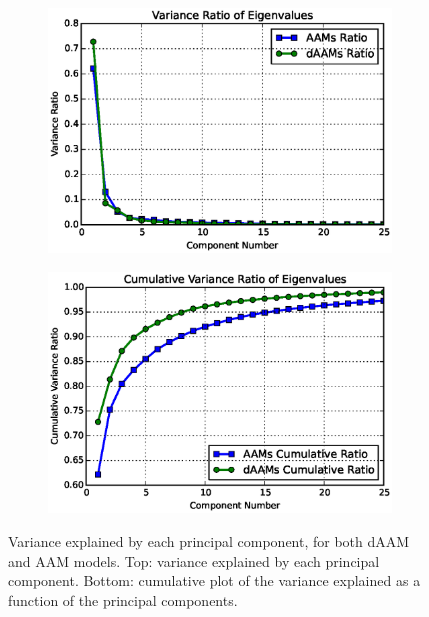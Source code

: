 \begin{figure}[!b]
    \centering
    \begin{subfigure}[b]{0.43\textwidth}
            \includegraphics[width=\textwidth]{Suplementory_Meterial/Model_Analysis/var_ratio}
    \end{subfigure}
    \begin{subfigure}[b]{0.43\textwidth}
            \includegraphics[width=\textwidth]{Suplementory_Meterial/Model_Analysis/cumu_var_ratio}
    \end{subfigure}
    \caption{Variance explained by each principal component, for both dAAM and AAM models. Top: variance explained by each principal component. Bottom: cumulative plot of the variance explained as a function of the principal components.}
    \label{fig:compact}
\end{figure}

